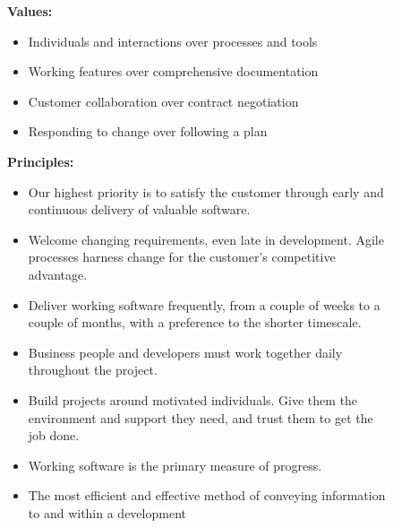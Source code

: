 \begin{figure}[h]
    \centering
     \begin{minipage}[t]{0.3\textwidth}
    \textbf{Values:}
        \begin{itemize}
            \item Individuals and interactions over processes and tools
            \item Working features over comprehensive documentation
            \item Customer collaboration over contract negotiation
            \item Responding to change over following a plan
        \end{itemize}
     \end{minipage}
        \hfill
    \begin{minipage}[t]{0.3\textwidth}
        \textbf{Principles:}
        \begin{itemize}
            \item Our highest priority is to satisfy the customer
                  through early and continuous delivery
                  of valuable software.
            \item Welcome changing requirements, even late in 
                    development. Agile processes harness change for 
                    the customer's competitive advantage.
            \item Deliver working software frequently, from a 
                    couple of weeks to a couple of months, with a 
                 preference to the shorter timescale.
            \item Business people and developers must work 
                    together daily throughout the project.
            \item Build projects around motivated individuals. 
                Give them the environment and support they need, 
                and trust them to get the job done.
            \item  Working software is the primary measure of progress.
        \end{itemize}
    \end{minipage}
            \hfill
    \begin{minipage}[t]{0.3\textwidth}
    \textbf{}
        \begin{itemize}
            \item The most efficient and effective method of 
                conveying information to and within a development 

\end{itemize}
\end{minipage}
\end{figure}
